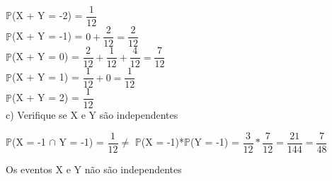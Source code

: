 \documentclass[12pt,a4paper,draft,final,oneside]{article}
\begin{document}
	\vspace{0.5cm}
	$\mathbb{P}$(X + Y = -2) = $\dfrac{1}{12}$\\
	\vspace{0.5cm}
	$\mathbb{P}$(X + Y = -1) = $0 + \dfrac{2}{12} = \dfrac{2}{12}$\\
	\vspace{0.5cm}
	$\mathbb{P}$(X + Y = 0) = $\dfrac{2}{12} + \dfrac{1}{12} + \dfrac{4}{12} = \dfrac{7}{12}$\\
	\vspace{0.5cm}
	$\mathbb{P}$(X + Y = 1) = $\dfrac{1}{12} + 0 = \dfrac{1}{12}$\\
	\vspace{0.5cm}
	$\mathbb{P}$(X + Y = 2) = $\dfrac{1}{12}$
	\vspace{1cm}\\
	c) Verifique se X e Y são independentes
	\begin{center}
		$\mathbb{P}$(X = -1 $\cap$ Y = -1) = $\dfrac{1}{12} \neq$ $\mathbb{P}$(X = -1)*$\mathbb{P}$(Y = -1) = $\dfrac{3}{12}*\dfrac{7}{12} = \dfrac{21}{144} = \dfrac{7}{48}$ 
	\end{center}
	\vspace{0.5cm}
	Os eventos X e Y não são independentes
\end{document}
